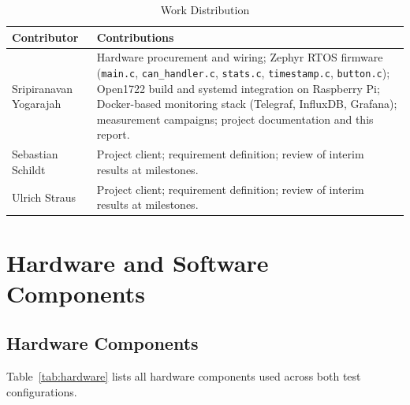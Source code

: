 \documentclass[11pt,a4paper]{article}
\begin{document}
\begin{table}[H]
    \centering
    \caption{Work Distribution}
    \label{tab:workdist}
    \begin{tabularx}{\textwidth}{|l|X|}
        \hline
        \textbf{Contributor} & \textbf{Contributions} \\
        \hline
        Sripiranavan Yogarajah &
            Hardware procurement and wiring; Zephyr RTOS firmware
            (\texttt{main.c}, \texttt{can\_handler.c}, \texttt{stats.c},
            \texttt{timestamp.c}, \texttt{button.c}); Open1722 build and
            systemd integration on Raspberry Pi; Docker-based monitoring
            stack (Telegraf, InfluxDB, Grafana); measurement campaigns;
            project documentation and this report. \\
        \hline
        Sebastian Schildt &
            Project client; requirement definition; review of interim
            results at milestones. \\
        \hline
        Ulrich Straus &
            Project client; requirement definition; review of interim
            results at milestones. \\
        \hline
    \end{tabularx}
\end{table}

\section{Hardware and Software Components}
\label{sec:components}

\subsection{Hardware Components}

Table~\ref{tab:hardware} lists all hardware components used across both test configurations.
\end{document}
